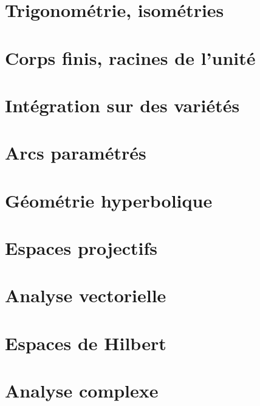 \documentclass[french,a4paper]{book}
\begin{document}
\chapter{Trigonométrie, isométries}









\chapter{Corps finis, racines de l'unité}


\chapter{Intégration sur des variétés}







\chapter{Arcs paramétrés}




\chapter{Géométrie hyperbolique}


\chapter{Espaces projectifs}




\chapter{Analyse vectorielle}


\chapter{Espaces de Hilbert}


\chapter{Analyse complexe}          \label{ChapICHIooXbLccl}



\end{document}

